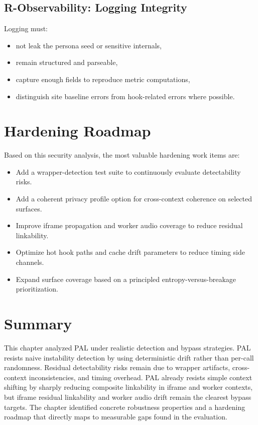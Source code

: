 \documentclass[11pt]{report}
\begin{document}
\subsection{R-Observability: Logging Integrity}

Logging must:
\begin{itemize}
    \item not leak the persona seed or sensitive internals,
    \item remain structured and parseable,
    \item capture enough fields to reproduce metric computations,
    \item distinguish site baseline errors from hook-related errors where possible.
\end{itemize}

\section{Hardening Roadmap}

Based on this security analysis, the most valuable hardening work items are:

\begin{itemize}
    \item Add a wrapper-detection test suite to continuously evaluate detectability risks.
    \item Add a coherent privacy profile option for cross-context coherence on selected surfaces.
    \item Improve iframe propagation and worker audio coverage to reduce residual linkability.
    \item Optimize hot hook paths and cache drift parameters to reduce timing side channels.
    \item Expand surface coverage based on a principled entropy-versus-breakage prioritization.
\end{itemize}

\section{Summary}

This chapter analyzed PAL under realistic detection and bypass strategies. PAL resists naive instability detection by using deterministic drift rather than per-call randomness. Residual detectability risks remain due to wrapper artifacts, cross-context inconsistencies, and timing overhead. PAL already resists simple context shifting by sharply reducing composite linkability in iframe and worker contexts, but iframe residual linkability and worker audio drift remain the clearest bypass targets. The chapter identified concrete robustness properties and a hardening roadmap that directly maps to measurable gaps found in the evaluation.
\end{document}
